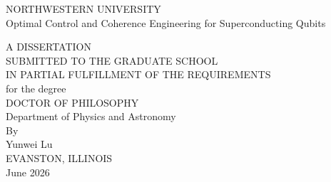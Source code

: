 
\newcommand{\thesisTitle}{Optimal Control and Coherence Engineering for Superconducting Qubits}
\newcommand{\yourName}{Yunwei Lu}
\newcommand{\yourSchool}{Northwestern University}
\newcommand{\yourMonth}{June}
\newcommand{\yourYear}{2026}
\newcommand{\formattitlespace}{0.6in}




\begin{titlepage}
\begin{center}
\begin{singlespacing}
\vspace{5\baselineskip}
\MakeUppercase{\yourSchool}\\
\vspace{\formattitlespace} %
\thesisTitle\\
\vspace{\formattitlespace} %

A DISSERTATION\\
\vspace{\formattitlespace} %
SUBMITTED TO THE GRADUATE SCHOOL\\
IN PARTIAL FULFILLMENT OF THE REQUIREMENTS\\
\vspace{\formattitlespace} %
for the degree\\
\vspace{\formattitlespace} %
DOCTOR OF PHILOSOPHY\\
\vspace{\formattitlespace} %
Department of Physics and Astronomy\\
\vspace{\formattitlespace} %
By\\
\vspace{1\baselineskip}
\yourName\\
\vspace{\formattitlespace} %
EVANSTON, ILLINOIS\\
\vspace{\formattitlespace} %
\yourMonth{} \yourYear{}\\
\vspace{\formattitlespace} %
\vfill


\end{singlespacing}

\end{center}
\end{titlepage}


